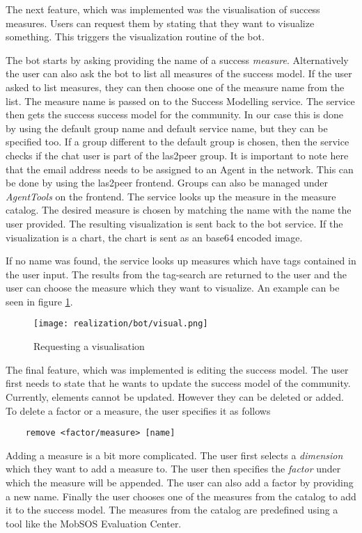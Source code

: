 The next feature, which was implemented was the visualisation of success measures. Users can request them by stating that they want to visualize something.
This triggers the visualization routine of the bot.

The bot starts by asking providing the name of a success \emph{measure}. Alternatively the user can also ask the bot to list all measures of the success model.
If the user asked to list measures, they can then choose one of the measure name from the list. 
The measure name is passed on to the Success Modelling service. The service then gets the success success model for the community. In our case this is done by using the default group name and default service name, but they can be specified too.
If a group different to the default group is chosen, then the service checks if the chat user is part of the las2peer group. 
It is important to note here that the email address needs to be assigned to an Agent in the network. 
This can be done by using the las2peer frontend. 
Groups can also be managed under \emph{AgentTools} on the frontend.  
The service looks up the measure in the measure catalog. The desired measure is chosen by matching the name with the name the user provided. 
The resulting visualization is sent back to the bot service. If the visualization is a chart, the chart is sent as an base64 encoded image.

If no name was found, the service looks up measures which have tags contained in the user input. The results from the tag-search are returned to the user and the user can choose the measure which they want to visualize.
An example can be seen in figure \ref{fig:visualReq}.
\begin{figure}[h]
    \centering
    \texttt{[image: realization/bot/visual.png]}
    \caption{Requesting a visualisation}
    \label{fig:visualReq}
\end{figure}


The final feature, which was implemented is editing the success model. The user first needs to state that he wants to update the success model of the community.
Currently, elements cannot be updated. 
However they can be deleted or added. 
To delete a factor or a measure, the user specifies it as follows \begin{lstlisting}
    remove <factor/measure> [name]
\end{lstlisting}  
Adding a measure is a bit more complicated. The user first selects a \emph{dimension} which they want to add a measure to. The user then specifies the \emph{factor} under which the measure will be appended. The user can also add a factor by providing a new name. Finally the user chooses one of the measures from the catalog to add it to the success model. 
The measures from the catalog are predefined using a tool like the MobSOS Evaluation Center. 

